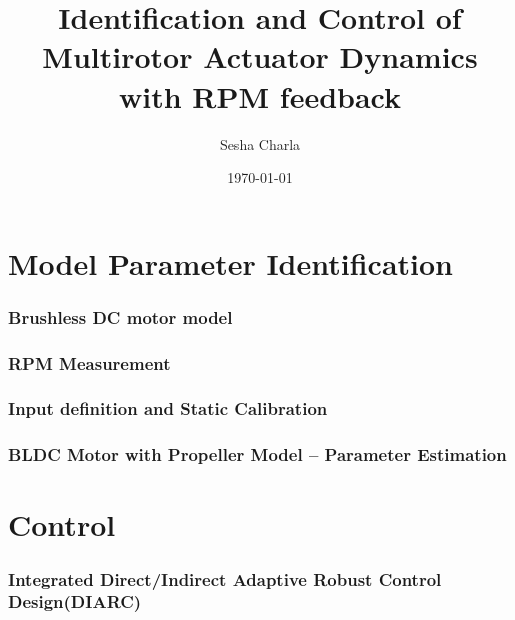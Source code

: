\documentclass[letterpaper, 11pt]{article}
\title{Identification and Control of Multirotor Actuator Dynamics with RPM feedback}
\author{Sesha Charla}
\date{\today}
\begin{document}
\maketitle
\tableofcontents
\newpage
\part{Model Parameter Identification}
\section{Brushless DC motor model}



\newpage
\section{RPM Measurement}

\newpage
\section{Input definition and Static Calibration}


\newpage
\section{BLDC Motor with Propeller Model -- Parameter Estimation}



\newpage
\part{Control}

\newpage
\section{Integrated Direct/Indirect Adaptive Robust Control Design(DIARC)}

% 
\end{document}
